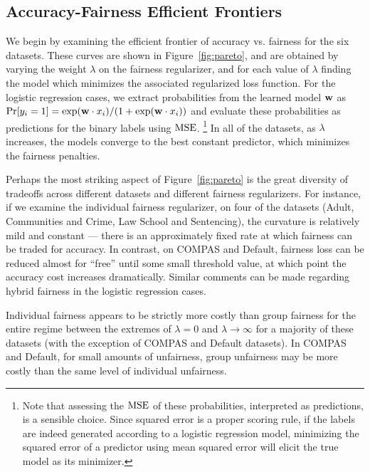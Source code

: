 \subsection{Accuracy-Fairness Efficient Frontiers}
\label{sec:pareto}

We begin by examining the efficient frontier of accuracy vs. fairness for
the six datasets.  These curves are shown in Figure~\ref{fig:pareto},
and are obtained by varying the weight $\lambda$ on the fairness
regularizer, and for each value of $\lambda$ finding the model which
minimizes the associated regularized loss function.  For the logistic
regression cases, we extract probabilities from the learned model
$\mathbf{w}$ as
$\Pr[y_i = 1] = {\exp(\mathbf{w} \cdot x_i)}/{(1 + \exp(\mathbf{w} \cdot x_i))}$ and
evaluate these probabilities as predictions for the binary labels
using $\textrm{MSE}$.  \footnote{Note that assessing the $\textrm{MSE}$ of these
  probabilities, interpreted as predictions, is a sensible choice.
  Since squared error is a proper scoring rule, if the labels are
  indeed generated according to a logistic regression model,
  minimizing the squared error of a predictor using mean squared error
  will elicit the true model as its minimizer.}
In all of the datasets, as $\lambda$
increases, the models converge to the best constant predictor,
which minimizes the fairness penalties.

Perhaps the most striking aspect of Figure~\ref{fig:pareto} is the
great diversity of tradeoffs across different datasets and different
fairness regularizers. For instance, if we examine the individual fairness
regularizer, on four of the datasets (Adult, Communities and Crime, Law School
and Sentencing), the curvature is relatively mild and constant --- there is
an approximately fixed rate at which fairness can be traded for accuracy.
In contrast, on COMPAS and Default, fairness loss can be reduced almost for ``free''
until some small threshold value, at which point the accuracy cost increases
dramatically. Similar comments can be made regarding hybrid fairness in the
logistic regression cases.

Individual fairness appears to be strictly more costly than group
fairness for the entire regime between the extremes of $\lambda = 0$
and $\lambda\rightarrow \infty$ for a majority of these datasets (with
the exception of COMPAS and Default datasets). In COMPAS and Default,
for small amounts of unfairness, group unfairness may be more costly
than the same level of individual unfairness.

